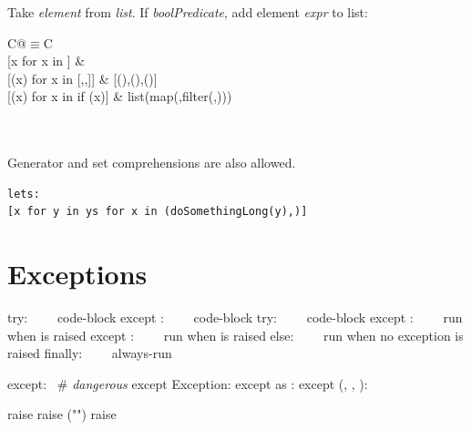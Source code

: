 \documentclass{refcard}
\begin{document}
Take \emph{element} from \emph{list}.
If \emph{boolPredicate}, add element \emph{expr} to list:\\
\begin{tabular}{C@{\s$\equiv$\s}C}
	 \\[1ex]
	{[}x for x in ]                   &  \\
	{[}(x) for x in [,,]]    & [(),(),()] \\
	{[}(x) for x in  if (x)]    & list(map(,filter(,))) \\
 \\
 \\
\end{tabular}
Generator  and set  comprehensions
	are also allowed.
\begin{verbatim}
lets:
[x for y in ys for x in (doSomethingLong(y),)]
\end{verbatim}



\section{Exceptions}

\begin{ldesc}
		try: \li
		~~~~code-block \li
		except : \li
		~~~~code-block \li
		try: \li
		~~~~code-block \li
		except : \li
		~~~~\textnormal{run when  is raised} \li
		except : \li
		~~~~\textnormal{run when  is raised} \li
		else: \li
		~~~~\textnormal{run when no exception is raised} \li
		finally: \li
		~~~~always-run \li

	   except: ~\# \textnormal{\emph{dangerous}}
	  except Exception:
	\li[catch as]                  except  as :
	 except (, , ): \li
	  

	       raise 
	    raise ("")
	  raise
\end{ldesc}
\end{document}
